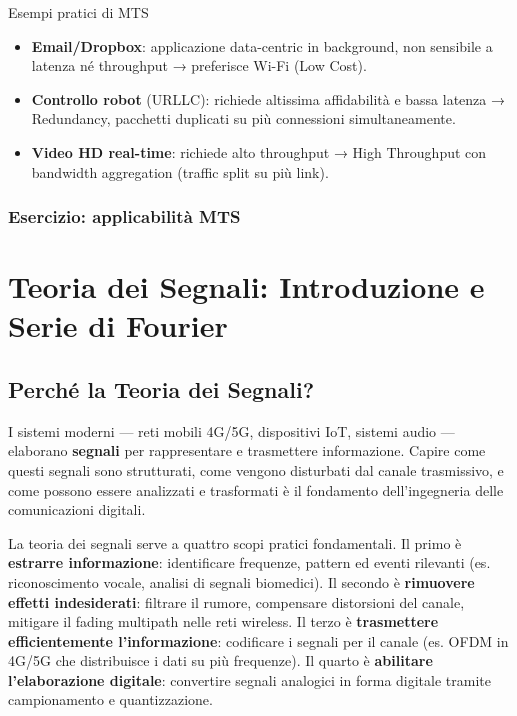 \documentclass[
  italian,
  openany]{book}
\providecommand{\tightlist}{%
  \setlength{\itemsep}{0pt}\setlength{\parskip}{0pt}}
\begin{document}
\begin{callouttip}{Esempi pratici di MTS}

\begin{itemize}
\tightlist
\item
  \textbf{Email/Dropbox}: applicazione data-centric in background, non
  sensibile a latenza né throughput → preferisce Wi-Fi (Low Cost).
\item
  \textbf{Controllo robot} (URLLC): richiede altissima affidabilità e
  bassa latenza → Redundancy, pacchetti duplicati su più connessioni
  simultaneamente.
\item
  \textbf{Video HD real-time}: richiede alto throughput → High
  Throughput con bandwidth aggregation (traffic split su più link).
\end{itemize}

\end{callouttip}

\subsection{Esercizio: applicabilità
MTS}\label{esercizio-applicabilituxe0-mts}

\newpage

\chapter{Teoria dei Segnali: Introduzione e Serie di
Fourier}\label{teoria-dei-segnali-introduzione-e-serie-di-fourier}

\section{Perché la Teoria dei
Segnali?}\label{perchuxe9-la-teoria-dei-segnali}

I sistemi moderni --- reti mobili 4G/5G, dispositivi IoT, sistemi audio
--- elaborano \textbf{segnali} per rappresentare e trasmettere
informazione. Capire come questi segnali sono strutturati, come vengono
disturbati dal canale trasmissivo, e come possono essere analizzati e
trasformati è il fondamento dell'ingegneria delle comunicazioni
digitali.

La teoria dei segnali serve a quattro scopi pratici fondamentali. Il
primo è \textbf{estrarre informazione}: identificare frequenze, pattern
ed eventi rilevanti (es. riconoscimento vocale, analisi di segnali
biomedici). Il secondo è \textbf{rimuovere effetti indesiderati}:
filtrare il rumore, compensare distorsioni del canale, mitigare il
fading multipath nelle reti wireless. Il terzo è \textbf{trasmettere
efficientemente l'informazione}: codificare i segnali per il canale (es.
OFDM in 4G/5G che distribuisce i dati su più frequenze). Il quarto è
\textbf{abilitare l'elaborazione digitale}: convertire segnali analogici
in forma digitale tramite campionamento e quantizzazione.
\end{document}

